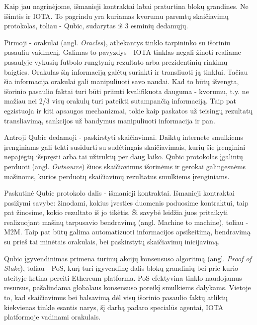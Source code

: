 Kaip jau nagrinėjome, išmanieji kontraktai labai praturtina blokų grandines. Ne išimtis ir IOTA. To pagrindu yra kuriamas kvorumu paremtų skaičiavimų protokolas, toliau - Qubic, sudarytas iš 3 esminių dedamųjų.

Pirmoji - orakulai (angl. \textit{Oracles}), atliekantys tinklo tarpininko su išoriniu pasauliu vaidmenį. Galimas to pavyzdys - IOTA tinklas negali žinoti realiame pasaulyje vykusių futbolo rungtynių rezultato arba prezidentinių rinkimų baigties. Orakulas šią informaciją galėtų surinkti ir transliuoti ją tinklui. Tačiau šia informacija orakulai gali manipuliuoti savo naudai. Kad to būtų išvengta, išorinio pasaulio faktai turi būti priimti kvalifikuota dauguma - kvorumu, t.y. ne mažiau nei 2/3 visų orakulų turi pateikti sutampančią informaciją. Taip pat egzistuoja ir kiti apsaugos mechanizmai, tokie kaip paskatos už teisingų rezultatų transliavimą, sankcijos už bandymus manipuliuoti informacija ir pan.

Antroji Qubic dedamoji - paskirstyti skaičiavimai. Daiktų internete smulkiems įrenginiams gali tekti susidurti su sudėtingais skaičiavimais, kurių šie įrenginiai nepajėgtų išspręsti arba tai užtruktų per daug laiko. Qubic protokolas įgalintų perduoti (angl. \textit{Outsource}) šiuos skaičiavimus išorinėms ir gerokai galingesnėms mašinoms, kurios perduotų skaičiavimų rezultatus smulkiems įrenginiams.

Paskutinė Qubic protokolo dalis - išmanieji kontraktai. Išmanieji kontraktai pasižymi savybe: žinodami, kokius įvesties duomenis paduosime kontraktui, taip pat žinosime, kokio rezultato iš jo tikėtis. Ši savybė leidžia juos pritaikyti realizuojant mašinų tarpusavio bendravimą (angl. Machine to machine), toliau - M2M. Taip pat būtų galima automatizuoti informacijos apsikeitimą, bendravimą su prieš tai minėtais orakulais, bei paskirstytų skaičiavimų inicijavimą.

Qubic įgyvendinimas primena turimų akcijų konsensuso algoritmą (angl. \textit{Proof of Stake}), toliau - PoS, kurį turi įgyvendinę dalis blokų grandinių bei prie kurio ateityje ketina pereiti Ethereum platforma. PoS efektyvina tinklo naudojamus resursus, pašalindama globalaus konsensuso poreikį smulkiems dalykams. Vietoje to, kad skaičiavimus bei balsavimą dėl visų išorinio pasaulio faktų atliktų kiekvienas tinkle esantis narys, šį darbą padaro specialūs agentai, IOTA platformoje vadinami orakulais.


